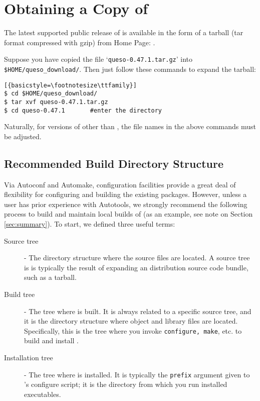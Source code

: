 \section{Obtaining a Copy of \Queso{}}

The latest supported public release of \Queso{} is available in the form of a tarball (tar format compressed with gzip) from \Queso{} Home Page: \Quesoweb.

Suppose you have copied the file `\verb+queso-0.47.1.tar.gz+' into \texttt{\$HOME/queso\_download/}.
Then just follow these commands to expand the tarball:
\begin{lstlisting}[{basicstyle=\footnotesize\ttfamily}]
$ cd $HOME/queso_download/
$ tar xvf queso-0.47.1.tar.gz
$ cd queso-0.47.1   	#enter the directory 
\end{lstlisting}

Naturally, for versions of \Queso{} other than \QUESOversion, the file names in the above commands must be adjusted.


\subsection{Recommended Build Directory Structure}\label{sec:Queso_tree}

Via Autoconf and Automake, \Queso{} configuration facilities provide a great deal 
of flexibility for configuring and building the existing \Queso{} packages. However,
unless a user has prior experience with Autotools, we strongly recommend
the following process to build and maintain local builds of \Queso{} (as an example, see note on Section \ref{sec:summary}).
To start, we defined three useful terms:

\begin{description}
 \item [Source tree] - The directory structure where the \Queso{} source files are located. A source
tree is is typically the result of expanding an \Queso{} distribution source code bundle, such as a tarball.%
 \item [Build tree] %
- The tree where \Queso{} is built. It is always related to a specific source tree, and it is the directory structure where object and library files are located. Specifically, this is the tree where you invoke \texttt{configure, make}, etc. to build and install \Queso{}. 
 \item [Installation tree] - The tree where \Queso{} is installed. It is typically the \texttt{prefix} argument given to \Queso{}'s configure script; it is the directory from which you run installed \Queso{} executables.
\end{description}

